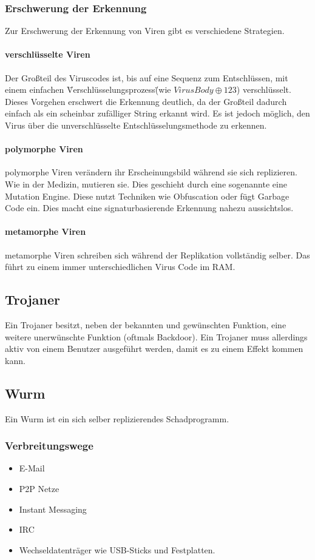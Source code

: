 \documentclass{report}
\begin{document}
\subsubsection{Erschwerung der Erkennung}
Zur Erschwerung der Erkennung von Viren gibt es verschiedene Strategien.
\paragraph{verschlüsselte Viren} Der Großteil des Viruscodes ist, bis auf eine Sequenz zum Entschlüssen, mit einem einfachen \"Verschlüsselungsprozess\" (wie $VirusBody \oplus 123$) verschlüsselt.
Dieses Vorgehen erschwert die Erkennung deutlich, da der Großteil dadurch einfach als ein scheinbar zufälliger String erkannt wird. Es ist jedoch möglich, den Virus über die unverschlüsselte Entschlüsselungsmethode zu erkennen.
\paragraph{polymorphe Viren} polymorphe Viren verändern ihr Erscheinungsbild während sie sich replizieren. Wie in der Medizin, mutieren sie. Dies geschieht durch eine sogenannte eine Mutation Engine. Diese nutzt Techniken wie Obfuscation oder fügt Garbage Code ein. 
Dies macht eine signaturbasierende Erkennung nahezu aussichtslos.
\paragraph{metamorphe Viren} metamorphe Viren schreiben sich während der Replikation vollständig selber. Das führt zu einem immer unterschiedlichen Virus Code im RAM.
\subsection{Trojaner}
Ein Trojaner besitzt, neben der bekannten und gewünschten Funktion, eine weitere unerwünschte Funktion (oftmals Backdoor).
Ein Trojaner muss allerdings aktiv von einem Benutzer ausgeführt werden, damit es zu einem Effekt kommen kann.
\subsection{Wurm}
Ein Wurm ist ein sich selber replizierendes Schadprogramm.
\subsubsection{Verbreitungswege}
\begin{itemize}
    \item E-Mail
    \item P2P Netze
    \item Instant Messaging
    \item IRC 
    \item Wechseldatenträger wie USB-Sticks und Festplatten.
\end{itemize}
\end{document}
